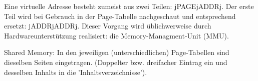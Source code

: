 \begin{answer}
  Eine virtuelle Adresse besteht zumeist aus zwei Teilen: jPAGEjADDRj. Der erste Teil wird bei Gebrauch in der Page-Tabelle nachgeschaut und entsprechend ersetzt: jADDRjADDRj.
  Dieser Vorgang wird üblichwerweise durch Hardwareunterstützung realisiert: die Memory-Managment-Unit (MMU).
\end{answer}

\begin{answer}
  Shared Memory:
  In den jeweiligen (unterschiedlichen) Page-Tabellen sind dieselben Seiten eingetragen. (Doppelter bzw. dreifacher Eintrag ein und desselben Inhalts in die 'Inhaltsverzeichnisse').
\end{answer}

